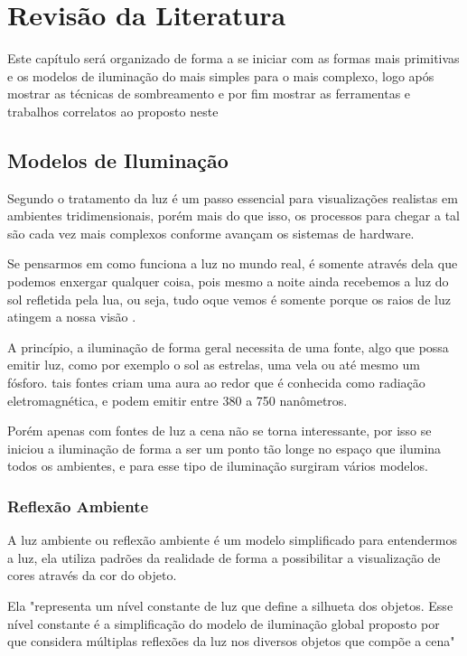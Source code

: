 \chapter{Revisão da Literatura}
\label{cap:02}

Este capítulo será organizado de forma a se iniciar com as formas mais primitivas e os modelos de iluminação do mais simples para o mais complexo, logo após mostrar as técnicas de sombreamento e por fim mostrar as ferramentas e trabalhos correlatos ao proposto neste

\section{Modelos de Iluminação}

Segundo  o tratamento da luz é um passo essencial para visualizações realistas em ambientes tridimensionais, porém mais do que isso, os processos para chegar a tal são cada vez mais complexos conforme avançam os sistemas de hardware.

Se pensarmos em como funciona a luz no mundo real, é somente através dela que podemos enxergar qualquer coisa, pois mesmo a noite ainda recebemos a luz do sol refletida pela lua, ou seja, tudo oque vemos é somente porque os raios de luz atingem a nossa visão \cite{manssour}.

A princípio, a iluminação de forma geral necessita de uma fonte, algo que possa emitir luz, como por exemplo o sol as estrelas, uma vela ou até mesmo um fósforo. tais fontes criam uma aura ao redor que é conhecida como radiação eletromagnética, e podem emitir entre 380 a 750 nanômetros. 

Porém apenas com fontes de luz a cena não se torna interessante, por isso se iniciou a iluminação de forma a ser um ponto tão longe no espaço que ilumina todos os ambientes, e para esse tipo de iluminação surgiram vários modelos.

\subsection{Reflexão Ambiente}

A luz ambiente ou reflexão ambiente é um modelo simplificado para entendermos a luz, ela utiliza padrões da realidade de forma a possibilitar a visualização de cores através da cor do objeto.

Ela "representa  um  nível  constante  de  luz  que  define  a  silhueta dos  objetos.  Esse  nível  constante  é  a  simplificação  do  modelo  de  iluminação  global proposto  por   que  considera  múltiplas  reflexões  da  luz  nos  diversos objetos que compõe a cena" \cite[p.~150]{Scalco2012}

